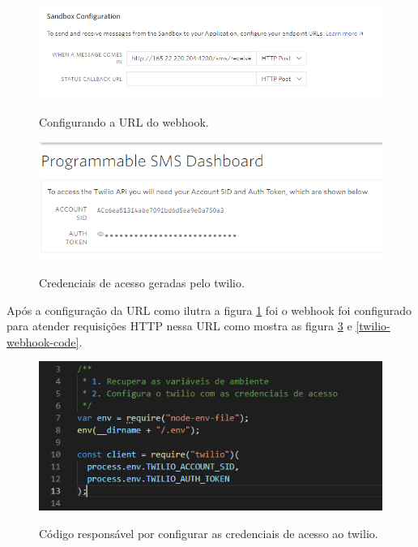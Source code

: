 \begin{figure}[H]
  \centering
   \caption{Configurando a URL do webhook.}
  \includegraphics[scale=0.5]{Imagens/urlcallback.PNG} 
  \label{url-twilio}
\end{figure}



\begin{figure}[H]
  \centering
   \caption{Credenciais de acesso geradas pelo twilio.}
  \includegraphics[scale=0.5]{Imagens/tokentwilio.PNG} 
  \label{twilio-tokens}
\end{figure}


Após a configuração da URL como ilutra a figura \ref{url-twilio} foi o webhook foi configurado para atender requisições HTTP nessa URL como mostra as figura \ref{twilio-tokens-code} e \ref{twilio-webhook-code}.


\begin{figure}[H]
  \centering
   \caption{Código responsável por configurar as credenciais de acesso ao twilio.}
  \includegraphics[scale=0.5]{Imagens/twilio-credenciais.PNG} 
  \label{twilio-tokens-code}
\end{figure}


